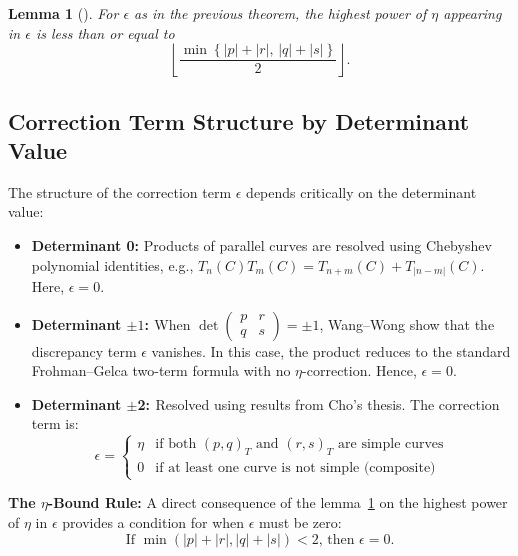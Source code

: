 \documentclass[12pt]{article}
\newtheorem{lemma}[theorem]{Lemma}
\begin{document}
\begin{lemma}[{\cite[Lemma 6.2]{abdiel2014}}] \label{lem:bound}
For $\epsilon$ as in the previous theorem, the highest power of $\eta$ appearing in $\epsilon$ is less than or equal to
\[
\left\lfloor \frac{\min\left\{ |p| + |r|,\, |q| + |s| \right\}}{2} \right\rfloor.
\]
\end{lemma}

\subsection{Correction Term Structure by Determinant Value}

The structure of the correction term $\epsilon$ depends critically on the determinant value:

\begin{itemize}
    \item \textbf{Determinant 0:} Products of parallel curves are resolved using Chebyshev polynomial identities, e.g., $T_n(C)T_m(C) = T_{n+m}(C) + T_{|n-m|}(C)$. Here, $\epsilon = 0$.
    
    \item \textbf{Determinant $\pm 1$: \cite{wangwong}} When $\det\begin{pmatrix}p & r \\ q & s\end{pmatrix} = \pm 1$, Wang--Wong show that the discrepancy term $\epsilon$ vanishes. In this case, the product reduces to the standard Frohman--Gelca two-term formula with no $\eta$-correction. Hence, $\epsilon = 0$.

    
    \item \textbf{Determinant $\pm$2: \cite{cho}} Resolved using results from Cho's thesis. The correction term is:
    \begin{equation}
    \epsilon = 
    \begin{cases}
    \eta & \text{if both } (p,q)_T \text{ and } (r,s)_T \text{ are simple curves} \\
    0 & \text{if at least one curve is not simple (composite)}
    \end{cases}
    \end{equation}
\end{itemize}
\textbf{The $\eta$-Bound Rule:} A direct consequence of the lemma~\ref{lem:bound} on the highest power of $\eta$ in $\epsilon$ provides a condition for when $\epsilon$ must be zero:
\begin{equation}
\text{If } \min(|p|+|r|, |q|+|s|) < 2 \text{, then } \epsilon = 0.
\end{equation}
\end{document}
